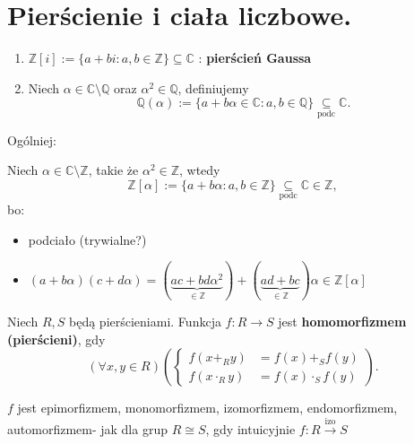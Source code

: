 \section{Pierścienie i ciała liczbowe.}
\begin{definition}
	\begin{enumerate}[label=\arabic*)]
		\item $\mathbb{Z} \left[ i \right] := \{a + bi: a,b \in \mathbb{Z} \} \subseteq \mathbb{C} $ : \textbf{pierścień Gaussa} 
		\item Niech $\alpha \in \mathbb{C} \setminus \mathbb{Q} $ oraz $\alpha ^2 \in \mathbb{Q} $, definiujemy
			\[
			\mathbb{Q} \left(\alpha  \right) := \{a + b\alpha \in \mathbb{C} : a,b \in \mathbb{Q} \} \underset{\scriptscriptstyle\text{podc}}{\subseteq} \mathbb{C} 
			.\] 
	\end{enumerate}
\end{definition} 
\begin{remark}
	Ogólniej:

	Niech $\alpha \in \mathbb{C} \setminus \mathbb{Z} $, takie że $\alpha ^2 \in \mathbb{Z} $, wtedy
	\[
	\mathbb{Z} \left[ \alpha  \right] := \{a + b\alpha :a,b \in \mathbb{Z} \} \underset{\scriptscriptstyle\text{podc}}{\subseteq} \mathbb{C} \in \mathbb{Z} 
	,\]
	bo:
	\begin{itemize}
		\item podciało (trywialne?)
		\item $\left( a + b\alpha  \right)\left( c + d \alpha  \right) = \left(\underbrace{ac + bd\alpha ^2}_{\in \mathbb{Z} }\right) + \left( \underbrace{ad + bc}_{\in \mathbb{Z} } \right) \alpha \in \mathbb{Z} \left[ \alpha  \right] $
	\end{itemize}
\end{remark} 
\begin{definition}
	Niech $R,S$ będą pierścieniami. Funkcja $f:R \to S$ jest \textbf{homomorfizmem (pierścieni)}, gdy
	\[
	\left(\forall x,y \in R \right)\left( \begin{cases}
			f\left( x +_{\scriptscriptstyle R} y \right) &= f\left( x \right) +_{\scriptscriptstyle S} f\left( y \right) \\
			f\left( x \cdot_{\scriptscriptstyle R} y \right) &= f\left( x \right) \cdot_{\scriptscriptstyle S} f\left( y \right) 
	\end{cases} \right)  
	.\] 

	$f$ jest epimorfizmem, monomorfizmem, izomorfizmem, endomorfizmem, automorfizmem- jak dla grup $R\cong S$, gdy intuicyjnie $f: R \overset{\text{izo}}{\to} S$
\end{definition} 
